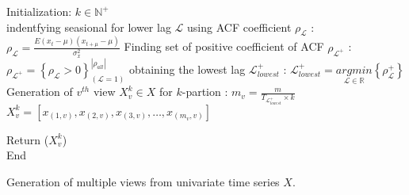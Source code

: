 \begin{algorithm}[!ht]
  \DontPrintSemicolon
  
    
  Initialization:  $k \in \mathbb{N}^+$\\ 
  indentfying seasional for lower lag $\mathscr{L}$ using ACF coefficient $\rho_{\mathscr{L}}$ :  
  $\rho_{\mathscr{L}}=\frac{E (x_t-\mu) (x_{t+\mu} -\mu)}{\sigma_x^2}$ 
  Finding set of positive coefficient of ACF $\rho_{\mathscr{L}^+}$ :  
  $\rho_{\mathscr{L}^+}= \left\{\rho_{\mathscr{L}} > 0 \right\}_{(\mathscr{L}=1)}^{ \left| \rho_{all} \right|}$ 
  obtaining the lowest lag $\mathscr{L}_{lowest}^+$ :  
  $ \mathscr{L}_{lowest}^+ = \underset{\mathscr{L} \in \mathbb{R}}{arg min} \left\{\rho_{\mathscr{L}}^+  \right\}$ 
  Generation of $v^{th}$ view $X_v^k \in X$ for $k$-partion :  
  $m_v=\frac{m}{T_{ \mathscr{L}_{lowest}^+ }\times k}$ 
  $X_v^k = [x_{(1, v)}, x_{(2, v)}, x_{(3, v)},  \dots , x_{(m_v, v)}]$

  Return ($X_v^k$)\\
  End
  \caption{Generation of multiple views from univariate time series $X$.}\label{alg1}
  \end{algorithm}
  


